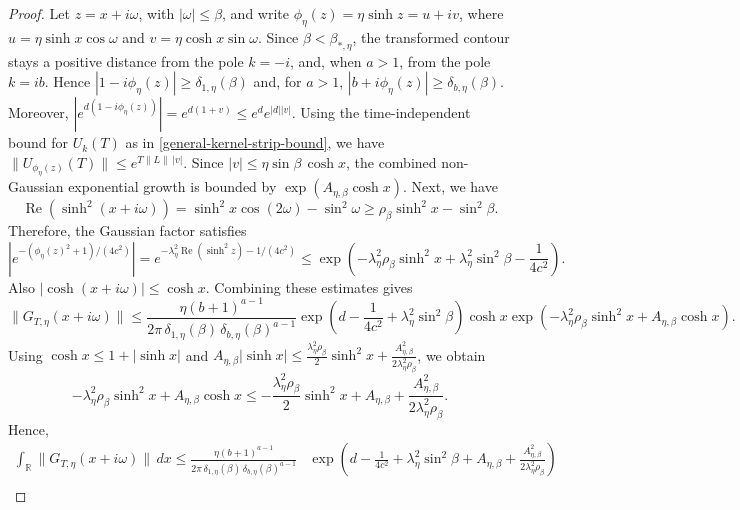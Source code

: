 \documentclass[10pt,reqno]{article}
\numberwithin{equation}{section}
\theoremstyle{plain}
\theoremstyle{definition}
\begin{document}
\begin{proof}
Let \(z=x+i\omega\), with \(|\omega|\le\beta\), and write \(\phi_\eta(z)=\eta\sinh z=u+iv\), where \(u=\eta\sinh x\cos\omega\) and \(v=\eta\cosh x\sin\omega\). Since \(\beta<\beta_{\ast,\eta}\), the transformed contour stays a positive distance from the pole \(k=-i\), and, when \(a>1\), from the pole \(k=ib\). Hence \(|1-i\phi_\eta(z)|\ge \delta_{1,\eta}(\beta)\) and, for \(a>1\), \(|b+i\phi_\eta(z)|\ge \delta_{b,\eta}(\beta)\). Moreover, \(|e^{d(1-i\phi_\eta(z))}|=e^{d(1+v)}\le e^d e^{|d||v|}\). Using the time-independent bound for \(U_k(T)\) as in \cref{general-kernel-strip-bound}, we have \(\|U_{\phi_\eta(z)}(T)\|\le e^{T\|L\|\,|v|}\). Since \(|v|\le \eta\sin\beta\,\cosh x\), the combined non-Gaussian exponential growth is bounded by \(\exp(A_{\eta,\beta}\cosh x)\). Next, we have
\begin{equation}
\operatorname{Re}(\sinh^2(x+i\omega)) = \sinh^2x\cos(2\omega)-\sin^2\omega \ge \rho_\beta\sinh^2x-\sin^2\beta.
\end{equation}
Therefore, the Gaussian factor satisfies
\begin{equation}
|e^{-(\phi_\eta(z)^2+1)/(4c^2)}| = e^{-\lambda_\eta^2\operatorname{Re}(\sinh^2 z)-1/(4c^2)} \le \exp\left(-\lambda_\eta^2\rho_\beta\sinh^2x+\lambda_\eta^2\sin^2\beta-\frac{1}{4c^2}\right).
\end{equation}
Also \(|\cosh(x+i\omega)|\le\cosh x\). Combining these estimates gives
\begin{equation}
\|G_{T,\eta}(x+i\omega)\| \le \frac{\eta (b+1)^{a-1}}{2\pi\,\delta_{1,\eta}(\beta)\,\delta_{b,\eta}(\beta)^{a-1}}\exp\left(d-\frac{1}{4c^2}+\lambda_\eta^2\sin^2\beta\right)\cosh x\exp\left(-\lambda_\eta^2\rho_\beta\sinh^2x+A_{\eta,\beta}\cosh x\right).
\end{equation}
Using \(\cosh x\le 1+|\sinh x|\) and \(A_{\eta,\beta}|\sinh x|\le \frac{\lambda_\eta^2\rho_\beta}{2}\sinh^2x+\frac{A_{\eta,\beta}^2}{2\lambda_\eta^2\rho_\beta}\), we obtain
\begin{equation}
-\lambda_\eta^2\rho_\beta\sinh^2x+A_{\eta,\beta}\cosh x \le -\frac{\lambda_\eta^2\rho_\beta}{2}\sinh^2x+A_{\eta,\beta}+\frac{A_{\eta,\beta}^2}{2\lambda_\eta^2\rho_\beta}.
\end{equation}
Hence,
\begin{align}
\int_{\mathbb R}\|G_{T,\eta}(x+i\omega)\|\,dx  \le \frac{\eta (b+1)^{a-1}}{2\pi\,\delta_{1,\eta}(\beta)\,\delta_{b,\eta}(\beta)^{a-1}} & \exp\left(d-\frac{1}{4c^2}+\lambda_\eta^2\sin^2\beta+A_{\eta,\beta}+\frac{A_{\eta,\beta}^2}{2\lambda_\eta^2\rho_\beta}\right) \\

\end{align}
\end{proof}
\end{document}
